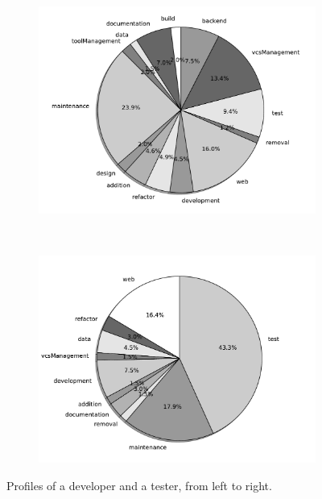 \documentclass[a4paper,11pt]{article}
\begin{document}
\begin{figure}[]
	\centering
	\begin{subfigure}[b]{.4\textwidth}
		\centering
		\includegraphics[width=\linewidth]{figures/infinica_developer.pdf}
	\end{subfigure}~
	\begin{subfigure}[b]{.4\textwidth}
		\centering
		\includegraphics[width=\linewidth]{figures/infinica_tester.pdf}
	\end{subfigure}
	\caption{Profiles of a developer and a tester, from left to right.}
	\label{fig:infinica-resources}
\end{figure}
\end{document}
